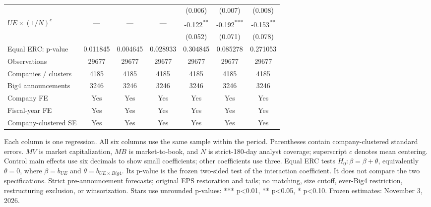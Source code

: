 \documentclass[10pt]{article}
\newcommand{\sym}[1]{\textsuperscript{#1}}
\begin{document}
\begin{tabular*}{\textwidth}{@{\extracolsep{\fill}}lcccccc@{}}
 &  &  &  & (0.006) & (0.007) & (0.008) \\
\(UE\times(1/N)^c\) & --- & --- & --- & -0.122\sym{**} & -0.192\sym{***} & -0.153\sym{**} \\
 &  &  &  & (0.052) & (0.071) & (0.078) \\
\midrule
Equal ERC: p-value & 0.011845 & 0.004645 & 0.028933 & 0.304845 & 0.085278 & 0.271053 \\
Observations & 29677 & 29677 & 29677 & 29677 & 29677 & 29677 \\
Companies / clusters & 4185 & 4185 & 4185 & 4185 & 4185 & 4185 \\
Big4 announcements & 3246 & 3246 & 3246 & 3246 & 3246 & 3246 \\
Company FE & Yes & Yes & Yes & Yes & Yes & Yes \\
Fiscal-year FE & Yes & Yes & Yes & Yes & Yes & Yes \\
Company-clustered SE & Yes & Yes & Yes & Yes & Yes & Yes \\
\bottomrule\end{tabular*}\par\medskip
\noindent\footnotesize Each column is one regression. All six columns use the same sample within the period. Parentheses contain company-clustered standard errors. \(MV\) is market capitalization, \(MB\) is market-to-book, and \(N\) is strict-180-day analyst coverage; superscript \(c\) denotes mean centering. Control main effects use six decimals to show small coefficients; other coefficients use three. Equal ERC tests \(H_0:\beta=\beta+\theta\), equivalently \(\theta=0\), where \(\beta=b_{UE}\) and \(\theta=b_{UE\times Big4}\). Its p-value is the frozen two-sided test of the interaction coefficient. It does not compare the two specifications. Strict pre-announcement forecasts; original EPS restoration and tails; no matching, size cutoff, ever-Big4 restriction, restructuring exclusion, or winsorization. Stars use unrounded p-values: *** p<0.01, ** p<0.05, * p<0.10. Frozen estimates: November 3, 2026.
\end{document}
